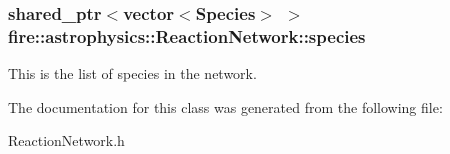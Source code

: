 \subsubsection[{species}]{\setlength{\rightskip}{0pt plus 5cm}shared\+\_\+ptr$<$vector$<${\bf Species}$>$ $>$ fire\+::astrophysics\+::\+Reaction\+Network\+::species}\label{a00034_ac3811889f4866a29a49ce3a8d0e80cad}
This is the list of species in the network. 

The documentation for this class was generated from the following file\+:\begin{DoxyCompactItemize}
\item 
Reaction\+Network.\+h\end{DoxyCompactItemize}
